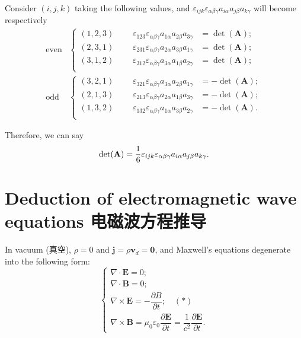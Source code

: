 Consider \((i, j, k)\) taking the following values, and \(\varepsilon_{ijk} \varepsilon_{\alpha \beta \gamma} a_{i \alpha} a_{j \beta} a_{k \gamma}\) will become respectively \begin{align*}
    \text{even} &
    \left\{
        \begin{aligned}
            (1, 2, 3) & \ \ \ & \varepsilon_{123} \varepsilon_{\alpha \beta \gamma} a_{1 \alpha} a_{2 \beta} a_{3 \gamma} & = \det (\mathbf A); \\
            (2, 3, 1) & \ \ \ & \varepsilon_{231} \varepsilon_{\alpha \beta \gamma} a_{2 \alpha} a_{3 \beta} a_{1 \gamma} & = \det (\mathbf A); \\
            (3, 1, 2) & \ \ \ & \varepsilon_{312} \varepsilon_{\alpha \beta \gamma} a_{3 \alpha} a_{1 \beta} a_{2 \gamma} & = \det (\mathbf A); \\
        \end{aligned}
    \right.
    \\
    \text{odd} &
    \left\{
        \begin{aligned}
            (3, 2, 1) & \ \ \ & \varepsilon_{321} \varepsilon_{\alpha \beta \gamma} a_{3 \alpha} a_{2 \beta} a_{1 \gamma} & = - \det (\mathbf A); \\
            (2, 1, 3) & \ \ \ & \varepsilon_{213} \varepsilon_{\alpha \beta \gamma} a_{2 \alpha} a_{1 \beta} a_{3 \gamma} & = - \det (\mathbf A); \\
            (1, 3, 2) & \ \ \ & \varepsilon_{132} \varepsilon_{\alpha \beta \gamma} a_{1 \alpha} a_{3 \beta} a_{2 \gamma} & = - \det (\mathbf A). \\
        \end{aligned}
    \right.
\end{align*}

Therefore, we can say
\[\det (\mathbf A) = {1 \over 6} \varepsilon_{ijk} \varepsilon_{\alpha \beta \gamma} a_{i \alpha} a_{j \beta} a_{k \gamma}.\]

\section{Deduction of electromagnetic wave equations
电磁波方程推导}\label{deduction-of-electromagnetic-wave-equations-ux7535ux78c1ux6ce2ux65b9ux7a0bux63a8ux5bfc}

In vacuum (真空), \(\rho = 0\) and
\(\boldsymbol j = \rho \boldsymbol v_d = \boldsymbol 0\), and Maxwell's
equations degenerate into the following form: \[\left \{
    \begin{array}{l} 
        \nabla \cdot \boldsymbol E = 0; \\
        \nabla \cdot \boldsymbol B = 0; \\
        \nabla \times \boldsymbol E = -\dfrac{\partial B}{\partial t}; \quad (*) \\[1.5ex]
        \nabla \times \boldsymbol B = \mu_0 \varepsilon_0 \dfrac{\partial \boldsymbol E}{ \partial t} = \dfrac{1}{c^2} \dfrac{\partial \boldsymbol E}{ \partial t}.
    \end{array} 
\right.\]

